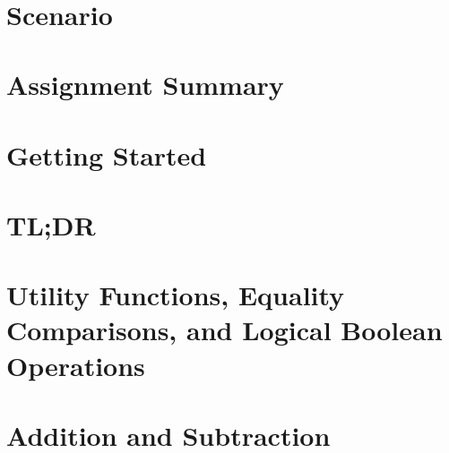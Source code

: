 \documentclass[12pt]{article}
\begin{document}
    \labidentifier\


    \softwareengineeringfrontmatter

    \section*{Scenario}                                                             \scenariointroduction

    \section{Assignment Summary}                                                    

    \section{Getting Started}                                                       

    \section{TL;DR} \label{sec:tldr}                                                

    \section{Utility Functions, Equality Comparisons, and Logical Boolean Operations}\label{sec:utility}
                                                                                    

    \section{Addition and Subtraction}                                              

%                                                                                    
\end{document}
